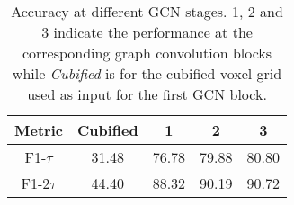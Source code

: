 \begin{table}[ht!]
\begin{center}
\begin{tabular}{c | c c c c}
    \hline
    Metric & Cubified & 1 & 2 & 3 \\
    \hline
    F1-$\tau$   & 31.48 & 76.78 & 79.88 & 80.80 \\
    F1-$2\tau$  & 44.40 & 88.32 & 90.19 & 90.72 \\
    \hline
\end{tabular}
\end{center}
\caption{
    Accuracy at different GCN stages. 1, 2 and 3 indicate the performance at the corresponding graph convolution blocks while \emph{Cubified} is for the cubified voxel grid used as input for the first GCN block.
}
\label{table:gcn_stages}
\end{table}

